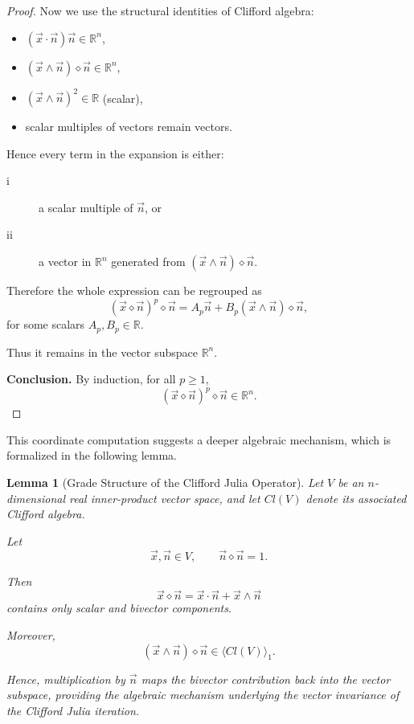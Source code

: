 \documentclass{amsart}
\theoremstyle{plain}
\newtheorem{lemma}{Lemma}
\numberwithin{equation}{section}
\begin{document}
\begin{proof}
Now we use the structural identities of Clifford algebra:
\begin{itemize}
	\item  $(\vec x \cdot \vec n)\vec n \in \mathbb{R}^n$, 
	\item  $(\vec x \wedge \vec n)\diamond \vec n \in \mathbb{R}^n$,
	\item  $(\vec x \wedge \vec n)^2 \in \mathbb{R}$ (scalar),
	\item  scalar multiples of vectors remain vectors.
\end{itemize}
Hence every term in the expansion is either:
\begin{description}
	\item[i] a scalar multiple of $\vec n$, or
	\item[ii] a vector in $\mathbb{R}^n$ generated from $(\vec x \wedge \vec n)\diamond \vec n$.
\end{description}


Therefore the whole expression can be regrouped as
\[
(\vec x \diamond \vec n)^p \diamond \vec n
=
A_p \vec n
+
B_p (\vec x \wedge \vec n)\diamond \vec n,
\]
for some scalars $A_p, B_p \in \mathbb{R}$.

Thus it remains in the vector subspace $\mathbb{R}^n$.

\textbf{Conclusion.}
By induction, for all $p \ge 1$,
\[
(\vec x \diamond \vec n)^p \diamond \vec n \in \mathbb{R}^n.
\]
\end{proof}


This coordinate computation suggests a deeper algebraic mechanism, which is formalized in the following lemma.

\begin{lemma}[Grade Structure of the Clifford Julia Operator]

Let $V$ be an $n$-dimensional real inner-product vector space,
and let $Cl(V)$ denote its associated Clifford algebra.

Let
\[
\vec x,\vec n \in V,
\qquad
\vec n\diamond\vec n =1.
\]

Then
\[
\vec x\diamond\vec n
=
\vec x\cdot\vec n
+
\vec x\wedge\vec n
\]
contains only scalar and bivector components.

Moreover,
\[
(\vec x\wedge\vec n)\diamond\vec n
\in
\langle Cl(V)\rangle_1.
\]

Hence, multiplication by $\vec n$ maps the bivector contribution
back into the vector subspace, providing the algebraic mechanism
underlying the vector invariance of the Clifford Julia iteration.

\end{lemma}
\end{document}
